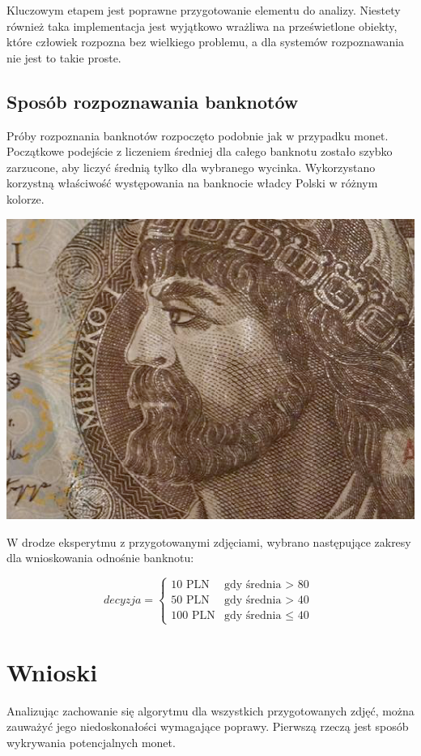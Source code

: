\documentclass{mwart}
\begin{document}
Kluczowym etapem jest poprawne przygotowanie elementu do analizy. Niestety również taka implementacja jest wyjątkowo wrażliwa na prześwietlone obiekty, które człowiek rozpozna bez wielkiego problemu, a dla systemów rozpoznawania nie jest to takie proste.

\subsection{Sposób rozpoznawania banknotów}

Próby rozpoznania banknotów rozpoczęto podobnie jak w przypadku monet. Początkowe podejście z liczeniem średniej dla całego banknotu zostało szybko zarzucone, aby liczyć średnią tylko dla wybranego wycinka. Wykorzystano korzystną właściwość występowania na banknocie władcy Polski w różnym kolorze.

\begin{center}
    \includegraphics[width=\textwidth]{10_PLN_part.png}
\end{center}

W drodze eksperytmu z przygotowanymi zdjęciami, wybrano następujące zakresy dla wnioskowania odnośnie banknotu:

$$
decyzja = \left\{\begin{array}{ll}
\textrm{10 PLN} & \textrm{gdy średnia $>$ 80}\\
\textrm{50 PLN} & \textrm{gdy średnia $>$ 40}\\
\textrm{100 PLN} & \textrm{gdy średnia $\leq$ 40 }
\end{array} \right.
$$

\section{Wnioski}
Analizując zachowanie się algorytmu dla wszystkich przygotowanych zdjęć, można zauważyć jego niedoskonałości wymagające poprawy. Pierwszą rzeczą jest sposób wykrywania potencjalnych monet.
\end{document}
